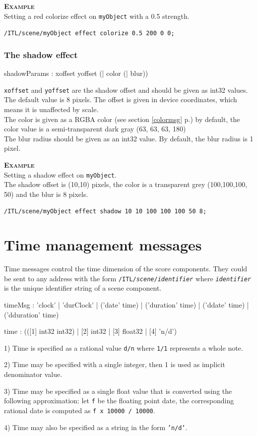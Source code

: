 \documentclass[a4paper,twoside]{report}
\newcommand{\toplevel}[1]	{\chapter{#1}}
\newcommand{\subsublevel}[1]	{\subsection{#1}}
\newcommand{\fullref}[1]	{\ref{#1} p.\pageref{#1}}
\newcommand{\OSC}[1]		{\texttt{#1}}
\newcommand{\values}[1]		{\texttt{#1}}
\newcommand{\example}		{\textbf{\hspace{-1.5cm}\textbf{\textsc{Example }}}}
\let\olditemize\itemize
\let\oldenditemize\enditemize
\renewenvironment{itemize} 	{\olditemize \setlength{\itemsep}{1mm}}{\oldenditemize}
\newcommand{\sample}	[1]			{\vspace{-2mm}\begin{center}\colorbox{mygrey}{
								\begin{minipage}[t]{0.9\columnwidth} 
								{\small \texttt{#1}}
								\end{minipage}}\end{center}}
\begin{document}
\example \\
Setting a red colorize effect on \OSC{myObject} with a 0.5 strength.
\sample{/ITL/scene/myObject effect colorize 0.5 200 0 0;}


\subsublevel{The shadow effect}

\begin{rail}
shadowParams : xoffset yoffset (| color (| blur))
\end{rail}

\OSC{xoffset} and \OSC{yoffset} are the shadow offset and should be given as int32 values. The default value is 8 pixels. The offset is given in device coordinates, which means it is unaffected by scale. \\
The color is given as a RGBA color (see section \fullref{colormsg}) by default, the color value is a semi-transparent dark gray (63, 63, 63, 180) \\
The blur radius should be given as an int32 value. By default, the blur radius is 1 pixel.

\example \\
Setting a shadow effect on \OSC{myObject}. \\
The shadow offset is (10,10) pixels, the color is a transparent grey (100,100,100, 50) and the blur is 8 pixels.
\sample{/ITL/scene/myObject effect shadow 10 10 100 100 100 50 8;}


\toplevel{Time management messages}
\label{time}
Time messages control the time dimension of the score components. They could be sent to any address with the form \OSC{/ITL/\textit{scene}/\textit{identifier}} where \OSC{\textit{identifier}} is the unique identifier string of a scene component.
\begin{rail}
timeMsg : 'clock'
		| 'durClock' 
		| ('date' time)
		| ('duration' time) 
		| ('ddate' time) 
		| ('dduration' time) 
\end{rail}

\begin{rail}
time : (([1] int32 int32) | [2] int32 | [3] float32 | [4] 'n/d')
\end{rail}

\begin{itemize}
\item 1) Time is specified as a rational value \values{d/n} where \values{1/1} represents a whole note. 
\item 2) Time may be specified with a single integer, then 1 is used as implicit denominator value.
\item 3) Time may be specified as a single float value that is converted using the following approximation: let \values{f} be the floating point date, the corresponding rational date is computed as \values{f x 10000 / 10000}.
\item 4) Time may also be specified as a string in the form \OSC{'n/d'}.
\end{itemize}
\end{document}
